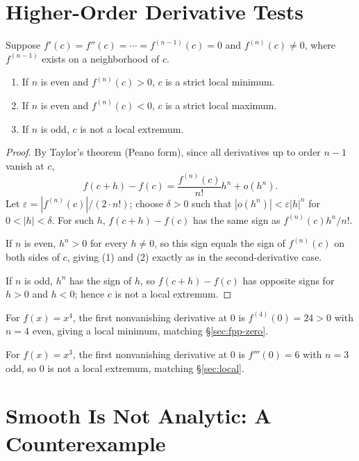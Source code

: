 \documentclass{essay}
\begin{document}
\section{Higher-Order Derivative Tests}

\begin{theorem}
  Suppose \(f'(c)=f''(c)=\cdots=f^{(n-1)}(c)=0\) and \(f^{(n)}(c)\neq0\),
  where \(f^{(n-1)}\) exists on a neighborhood of \(c\).
  \begin{enumerate}
    \item If \(n\) is even and \(f^{(n)}(c)>0\), \(c\) is a strict local
      minimum.
    \item If \(n\) is even and \(f^{(n)}(c)<0\), \(c\) is a strict local
      maximum.
    \item If \(n\) is odd, \(c\) is not a local extremum.
  \end{enumerate}
\end{theorem}

\begin{proof}
  By Taylor's theorem (Peano form), since all derivatives up to order
  \(n-1\) vanish at \(c\),
  \[ f(c+h)-f(c)=\frac{f^{(n)}(c)}{n!}h^{n}+o(h^{n}). \]
  Let \(\varepsilon=|f^{(n)}(c)|/(2\cdot n!)\); choose \(\delta>0\) such that
  \(|o(h^{n})|<\varepsilon|h|^{n}\) for \(0<|h|<\delta\). For such \(h\),
  \(f(c+h)-f(c)\) has the same sign as \(f^{(n)}(c)h^{n}/n!\).

  If \(n\) is even, \(h^{n}>0\) for every \(h\neq0\), so this sign equals the
  sign of \(f^{(n)}(c)\) on both sides of \(c\), giving (1) and (2) exactly
  as in the second-derivative case.

  If \(n\) is odd, \(h^{n}\) has the sign of \(h\), so \(f(c+h)-f(c)\) has
  opposite signs for \(h>0\) and \(h<0\); hence \(c\) is not a local
  extremum.
\end{proof}

\begin{example}
  For \(f(x)=x^{4}\), the first nonvanishing derivative at \(0\) is
  \(f^{(4)}(0)=24>0\) with \(n=4\) even, giving a local minimum, matching
  \S\ref{sec:fpp-zero}.
\end{example}

\begin{example}
  For \(f(x)=x^{3}\), the first nonvanishing derivative at \(0\) is
  \(f'''(0)=6\) with \(n=3\) odd, so \(0\) is not a local extremum, matching
  \S\ref{sec:local}.
\end{example}

\section{Smooth Is Not Analytic: A Counterexample}
\end{document}

